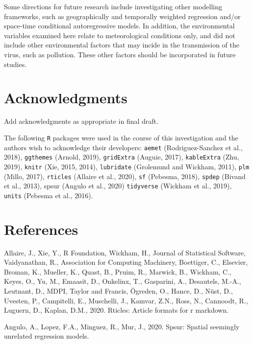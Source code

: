 \documentclass[]{elsarticle} %
\begin{document}
Some directions for future research include investigating other
modelling frameworks, such as geographically and temporally weighted
regression and/or space-time conditional autoregressive models. In
addition, the environmental variables examined here relate to
meteorological conditions only, and did not include other environmental
factors that may incide in the transmission of the virus, such as
pollution. These other factors should be incorporated in future studies.

\hypertarget{acknowledgments}{%
\section*{Acknowledgments}\label{acknowledgments}}

Add acknowledgments as appropriate in final draft.

The following \texttt{R} packages were used in the course of this
investigation and the authors wish to acknowledge their developers:
\texttt{aemet} (Rodriguez-Sanchez et al., 2018), \texttt{ggthemes}
(Arnold, 2019), \texttt{gridExtra} (Auguie, 2017), \texttt{kableExtra}
(Zhu, 2019), \texttt{knitr} (Xie, 2015, 2014), \texttt{lubridate}
(Grolemund and Wickham, 2011), \texttt{plm} (Millo, 2017),
\texttt{rticles} (Allaire et al., 2020), \texttt{sf} (Pebesma, 2018),
\texttt{spdep} (Bivand et al., 2013), spsur (Angulo et al., 2020)
\texttt{tidyverse} (Wickham et al., 2019), \texttt{units} (Pebesma et
al., 2016).

\hypertarget{references}{%
\section*{References}\label{references}}

\hypertarget{refs}{}
\leavevmode\hypertarget{ref-Allaire2020}{}%
Allaire, J., Xie, Y., R Foundation, Wickham, H., Journal of Statistical
Software, Vaidyanathan, R., Association for Computing Machinery,
Boettiger, C., Elsevier, Broman, K., Mueller, K., Quast, B., Pruim, R.,
Marwick, B., Wickham, C., Keyes, O., Yu, M., Emaasit, D., Onkelinx, T.,
Gasparini, A., Desautels, M.-A., Leutnant, D., MDPI, Taylor and Francis,
Ögreden, O., Hance, D., Nüst, D., Uvesten, P., Campitelli, E.,
Muschelli, J., Kamvar, Z.N., Ross, N., Cannoodt, R., Luguern, D.,
Kaplan, D.M., 2020. Rticles: Article formats for r markdown.

\leavevmode\hypertarget{ref-Angulo2020spsur}{}%
Angulo, A., Lopez, F.A., Minguez, R., Mur, J., 2020. Spsur: Spatial
seemingly unrelated regression models.
\end{document}

